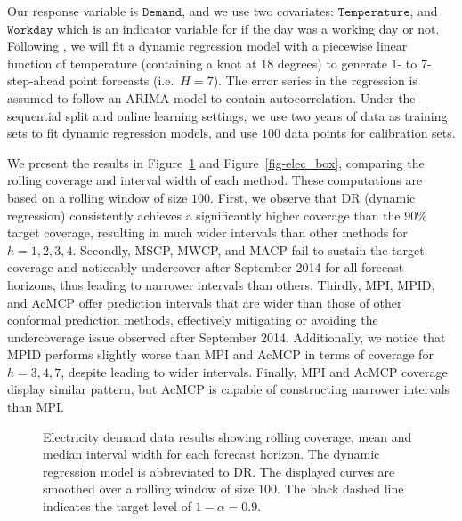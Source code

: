 \documentclass[
  11pt,
  a4paper,
]{article}
\theoremstyle{plain}
\theoremstyle{plain}
\theoremstyle{remark}
\begin{document}
Our response variable is \(\texttt{Demand}\), and we use two covariates:
\(\texttt{Temperature}\), and \(\texttt{Workday}\) which is an indicator
variable for if the day was a working day or not. Following
\textcite{hyndman2021}, we will fit a dynamic regression model with a
piecewise linear function of temperature (containing a knot at \(18\)
degrees) to generate \(1\)- to \(7\)-step-ahead point forecasts
(i.e.~\(H=7\)). The error series in the regression is assumed to follow
an ARIMA model to contain autocorrelation. Under the sequential split
and online learning settings, we use two years of data as training sets
to fit dynamic regression models, and use \(100\) data points for
calibration sets.

We present the results in Figure~\ref{fig-elec_cov} and
Figure~\ref{fig-elec_box}, comparing the rolling coverage and interval
width of each method. These computations are based on a rolling window
of size \(100\). First, we observe that DR (dynamic regression)
consistently achieves a significantly higher coverage than the \(90\%\)
target coverage, resulting in much wider intervals than other methods
for \(h=1,2,3,4\). Secondly, MSCP, MWCP, and MACP fail to sustain the
target coverage and noticeably undercover after September 2014 for all
forecast horizons, thus leading to narrower intervals than others.
Thirdly, MPI, MPID, and AcMCP offer prediction intervals that are wider
than those of other conformal prediction methods, effectively mitigating
or avoiding the undercoverage issue observed after September 2014.
Additionally, we notice that MPID performs slightly worse than MPI and
AcMCP in terms of coverage for \(h=3,4,7\), despite leading to wider
intervals. Finally, MPI and AcMCP coverage display similar pattern, but
AcMCP is capable of constructing narrower intervals than MPI.

\begin{figure}


\caption{\label{fig-elec_cov}Electricity demand data results showing
rolling coverage, mean and median interval width for each forecast
horizon. The dynamic regression model is abbreviated to DR. The
displayed curves are smoothed over a rolling window of size \(100\). The
black dashed line indicates the target level of \(1-\alpha=0.9\).}

\end{figure}%
\end{document}
